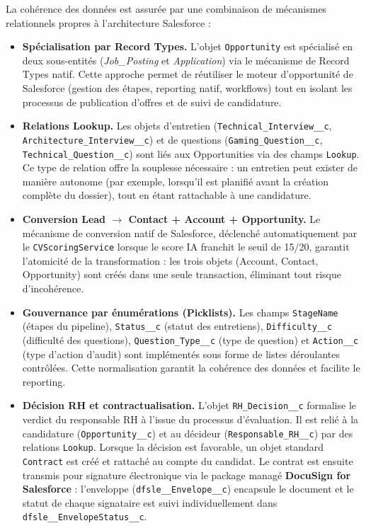 La cohérence des données est assurée par une combinaison de mécanismes relationnels propres à l'architecture Salesforce :

\begin{itemize}
    \item \textbf{Spécialisation par Record Types.} L'objet \texttt{Opportunity} est spécialisé en deux sous-entités (\textit{Job\_Posting} et \textit{Application}) via le mécanisme de Record Types natif. Cette approche permet de réutiliser le moteur d'opportunité de Salesforce (gestion des étapes, reporting natif, workflows) tout en isolant les processus de publication d'offres et de suivi de candidature.
    
    \item \textbf{Relations Lookup.} Les objets d'entretien (\texttt{Technical\_Interview\_\_c}, \texttt{Architecture\_Interview\_\_c}) et de questions (\texttt{Gaming\_Question\_\_c}, \texttt{Technical\_Question\_\_c}) sont liés aux Opportunities via des champs \texttt{Lookup}. Ce type de relation offre la souplesse nécessaire : un entretien peut exister de manière autonome (par exemple, lorsqu'il est planifié avant la création complète du dossier), tout en étant rattachable à une candidature.
    
    \item \textbf{Conversion Lead $\rightarrow$ Contact + Account + Opportunity.} Le mécanisme de conversion natif de Salesforce, déclenché automatiquement par le \texttt{CVScoringService} lorsque le score IA franchit le seuil de 15/20, garantit l'atomicité de la transformation : les trois objets (Account, Contact, Opportunity) sont créés dans une seule transaction, éliminant tout risque d'incohérence.
    
    \item \textbf{Gouvernance par énumérations (Picklists).} Les champs \texttt{StageName} (étapes du pipeline), \texttt{Status\_\_c} (statut des entretiens), \texttt{Difficulty\_\_c} (difficulté des questions), \texttt{Question\_Type\_\_c} (type de question) et \texttt{Action\_\_c} (type d'action d'audit) sont implémentés sous forme de listes déroulantes contrôlées. Cette normalisation garantit la cohérence des données et facilite le reporting.
    
    \item \textbf{Décision RH et contractualisation.} L'objet \texttt{RH\_Decision\_\_c} formalise le verdict du responsable RH à l'issue du processus d'évaluation. Il est relié à la candidature (\texttt{Opportunity\_\_c}) et au décideur (\texttt{Responsable\_RH\_\_c}) par des relations \texttt{Lookup}. Lorsque la décision est favorable, un objet standard \texttt{Contract} est créé et rattaché au compte du candidat. Le contrat est ensuite transmis pour signature électronique via le package managé \textbf{DocuSign for Salesforce} : l'enveloppe (\texttt{dfsle\_\_Envelope\_\_c}) encapsule le document et le statut de chaque signataire est suivi individuellement dans \texttt{dfsle\_\_EnvelopeStatus\_\_c}.
    

\end{itemize}
